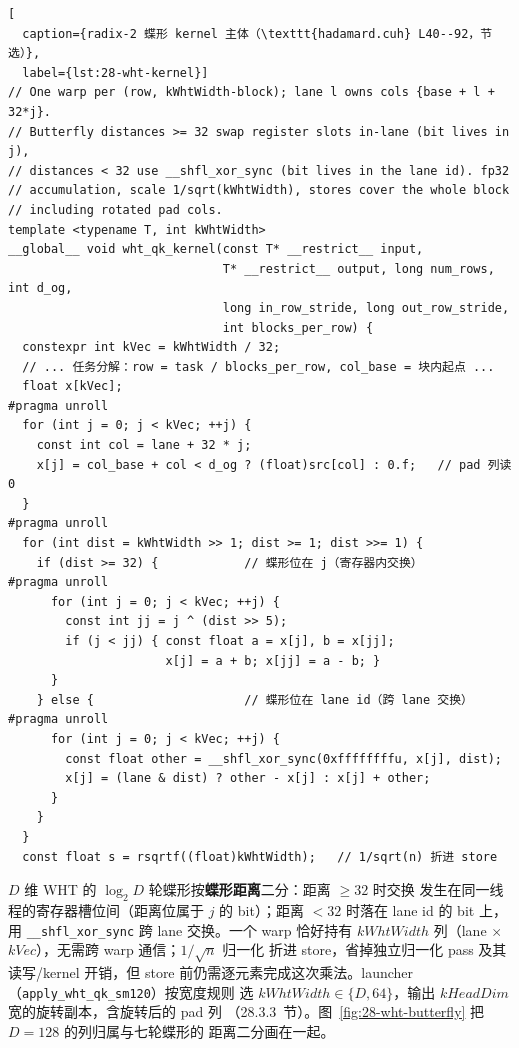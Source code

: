 \begin{lstlisting}[
  caption={radix-2 蝶形 kernel 主体（\texttt{hadamard.cuh} L40--92，节选）},
  label={lst:28-wht-kernel}]
// One warp per (row, kWhtWidth-block); lane l owns cols {base + l + 32*j}.
// Butterfly distances >= 32 swap register slots in-lane (bit lives in j),
// distances < 32 use __shfl_xor_sync (bit lives in the lane id). fp32
// accumulation, scale 1/sqrt(kWhtWidth), stores cover the whole block
// including rotated pad cols.
template <typename T, int kWhtWidth>
__global__ void wht_qk_kernel(const T* __restrict__ input,
                              T* __restrict__ output, long num_rows, int d_og,
                              long in_row_stride, long out_row_stride,
                              int blocks_per_row) {
  constexpr int kVec = kWhtWidth / 32;
  // ... 任务分解：row = task / blocks_per_row, col_base = 块内起点 ...
  float x[kVec];
#pragma unroll
  for (int j = 0; j < kVec; ++j) {
    const int col = lane + 32 * j;
    x[j] = col_base + col < d_og ? (float)src[col] : 0.f;   // pad 列读 0
  }
#pragma unroll
  for (int dist = kWhtWidth >> 1; dist >= 1; dist >>= 1) {
    if (dist >= 32) {            // 蝶形位在 j（寄存器内交换）
#pragma unroll
      for (int j = 0; j < kVec; ++j) {
        const int jj = j ^ (dist >> 5);
        if (j < jj) { const float a = x[j], b = x[jj];
                      x[j] = a + b; x[jj] = a - b; }
      }
    } else {                     // 蝶形位在 lane id（跨 lane 交换）
#pragma unroll
      for (int j = 0; j < kVec; ++j) {
        const float other = __shfl_xor_sync(0xffffffffu, x[j], dist);
        x[j] = (lane & dist) ? other - x[j] : x[j] + other;
      }
    }
  }
  const float s = rsqrtf((float)kWhtWidth);   // 1/sqrt(n) 折进 store
\end{lstlisting}

$D$ 维 WHT 的 $\log_2 D$ 轮蝶形按\textbf{蝶形距离}二分：距离 $\ge 32$ 时交换
发生在同一线程的寄存器槽位间（距离位属于 $j$ 的 bit）；距离 $<32$ 时落在 lane id
的 bit 上，用 \texttt{\_\_shfl\_xor\_sync} 跨 lane 交换。一个 warp 恰好持有
$kWhtWidth$ 列（lane $\times$ $kVec$），无需跨 warp 通信；$1/\sqrt{n}$ 归一化
折进 store，省掉独立归一化 pass 及其读写/kernel 开销，但 store 前仍需逐元素完成这次乘法。launcher（\texttt{apply\_wht\_qk\_sm120}）按宽度规则
选 $kWhtWidth \in \{D, 64\}$，输出 $kHeadDim$ 宽的旋转副本，含旋转后的 pad 列
（28.3.3~节）。图~\ref{fig:28-wht-butterfly} 把 $D{=}128$ 的列归属与七轮蝶形的
距离二分画在一起。

